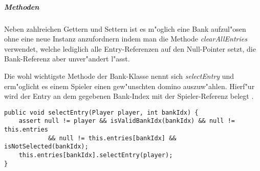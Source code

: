 \subparagraph{Methoden}
Neben zahlreichen Gettern und Settern ist es m"oglich eine Bank aufzul"osen ohne eine neue Instanz anzufordnern indem man die Methode \emph{clearAllEntries} verwendet, welche lediglich alle Entry-Referenzen auf den Null-Pointer setzt, die Bank-Referenz aber unver"andert l"asst. 

Die wohl wichtigste Methode der Bank-Klasse nennt sich \emph{selectEntry} und erm"oglicht es einem Spieler einen gew"unschten domino auszuw"ahlen. Hierf"ur wird der Entry an dem gegebenen Bank-Index mit der Spieler-Referenz belegt . 


\begin{lstlisting}[style=CodeHighlighting,float,caption=Bank - selectEntry,label=lst:bank_selectEntry]
public void selectEntry(Player player, int bankIdx) {
    assert null != player && isValidBankIdx(bankIdx) && null != this.entries
            && null != this.entries[bankIdx] && isNotSelected(bankIdx);
    this.entries[bankIdx].selectEntry(player);
}
\end{lstlisting}